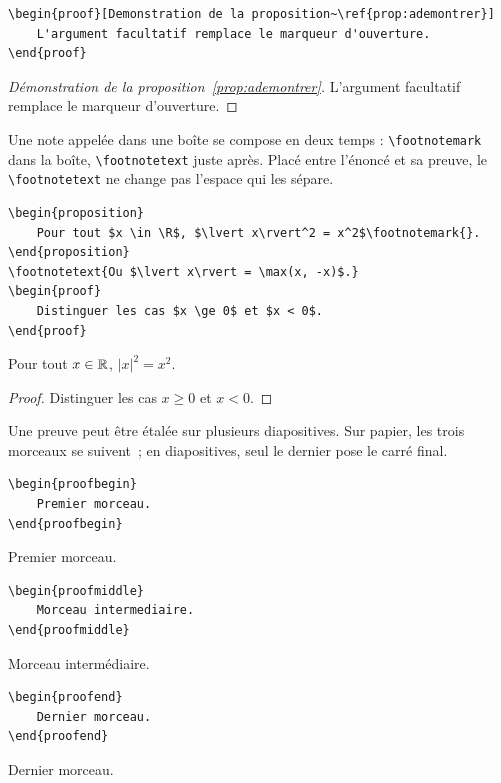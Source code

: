 \begin{lstlisting}
\begin{proof}[Demonstration de la proposition~\ref{prop:ademontrer}]
    L'argument facultatif remplace le marqueur d'ouverture.
\end{proof}
\end{lstlisting}
\begin{proof}[Démonstration de la proposition~\ref{prop:ademontrer}]
    L'argument facultatif remplace le marqueur d'ouverture.
\end{proof}

Une note appelée dans une boîte se compose en deux temps : \verb|\footnotemark|
dans la boîte, \verb|\footnotetext| juste après. Placé entre l'énoncé et sa
preuve, le \verb|\footnotetext| ne change pas l'espace qui les sépare.

\begin{lstlisting}
\begin{proposition}
    Pour tout $x \in \R$, $\lvert x\rvert^2 = x^2$\footnotemark{}.
\end{proposition}
\footnotetext{Ou $\lvert x\rvert = \max(x, -x)$.}
\begin{proof}
    Distinguer les cas $x \ge 0$ et $x < 0$.
\end{proof}
\end{lstlisting}
\begin{proposition}
    Pour tout $x \in \mathbb{R}$, $\lvert x\rvert^2 = x^2$\footnotemark{}.
\end{proposition}
\begin{proof}
    Distinguer les cas $x \ge 0$ et $x < 0$.
\end{proof}

Une preuve peut être étalée sur plusieurs diapositives. Sur papier, les trois
morceaux se suivent~; en diapositives, seul le dernier pose le carré final.

\begin{lstlisting}
\begin{proofbegin}
    Premier morceau.
\end{proofbegin}
\end{lstlisting}
\begin{proofbegin}
    Premier morceau.
\end{proofbegin}
\begin{lstlisting}
\begin{proofmiddle}
    Morceau intermediaire.
\end{proofmiddle}
\end{lstlisting}
\begin{proofmiddle}
    Morceau intermédiaire.
\end{proofmiddle}
\begin{lstlisting}
\begin{proofend}
    Dernier morceau.
\end{proofend}
\end{lstlisting}
\begin{proofend}
    Dernier morceau.
\end{proofend}

